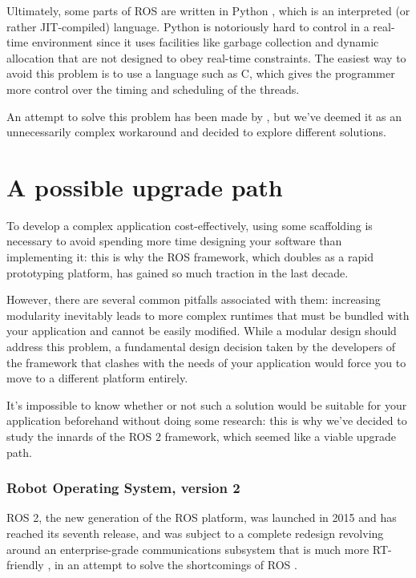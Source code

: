 \documentclass[a4paper,12pt]{report}
\begin{document}
Ultimately, some parts of ROS are written in Python \cite{roswiki-rospy}, which is an interpreted (or rather JIT-compiled) language. Python is notoriously hard to control in a real-time environment since it uses facilities like garbage collection \cite{python-devguide-gc} and dynamic allocation that are not designed to obey real-time constraints. The easiest way to avoid this problem is to use a language such as C, which gives the programmer more control over the timing and scheduling of the threads.

An attempt to solve this problem has been made by \textcite{rt-ros-approach}, but we've deemed it as an unnecessarily complex workaround and decided to explore different solutions.

\section{A possible upgrade path}

To develop a complex application cost-effectively, using some scaffolding is necessary to avoid spending more time designing your software than implementing it: this is why the ROS framework, which doubles as a rapid prototyping platform, has gained so much traction in the last decade. 

However, there are several common pitfalls associated with them: increasing modularity inevitably leads to more complex runtimes that must be bundled with your application and cannot be easily modified. While a modular design should address this problem, a fundamental design decision taken by the developers of the framework that clashes with the needs of your application would force you to move to a different platform entirely.

It's impossible to know whether or not such a solution would be suitable for your application beforehand without doing some research: this is why we've decided to study the innards of the ROS 2 framework, which seemed like a viable upgrade path.

\subsubsection{Robot Operating System, version 2}

ROS 2, the new generation of the ROS platform, was launched in 2015 and has reached its seventh release, and was subject to a complete redesign revolving around an enterprise-grade communications subsystem that is much more RT-friendly \cite{dds-design-performance}, in an attempt to solve the shortcomings of ROS \cite{ros2-realtime-intro}. 
\end{document}
